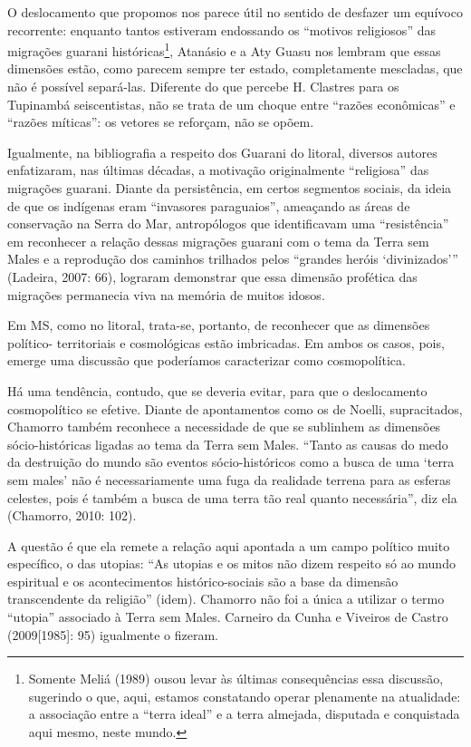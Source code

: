O deslocamento que propomos nos parece útil no sentido de desfazer um
equívoco recorrente: enquanto tantos estiveram endossando os ``motivos
religiosos'' das migrações guarani históricas\footnote{Somente Meliá
  (1989) ousou levar às últimas consequências essa discussão, sugerindo
  o que, aqui, estamos constatando operar plenamente na atualidade: a
  associação entre a ``terra ideal'' e a terra almejada, disputada e
  conquistada aqui mesmo, neste mundo.}, Atanásio e a Aty Guasu nos
lembram que essas dimensões estão, como parecem sempre ter estado,
completamente mescladas, que não é possível separá-las. Diferente do que
percebe H. Clastres para os Tupinambá seiscentistas, não se trata de um
choque entre ``razões econômicas'' e ``razões míticas'': os vetores se
reforçam, não se opõem.

Igualmente, na bibliografia a respeito dos Guarani do litoral, diversos
autores enfatizaram, nas últimas décadas, a motivação originalmente
``religiosa'' das migrações guarani. Diante da persistência, em certos
segmentos sociais, da ideia de que os indígenas eram ``invasores
paraguaios'', ameaçando as áreas de conservação na Serra do Mar,
antropólogos que identificavam uma ``resistência'' em reconhecer a
relação dessas migrações guarani com o tema da Terra sem Males e a
reprodução dos caminhos trilhados pelos ``grandes heróis `divinizados'''
(Ladeira, 2007: 66), lograram demonstrar que essa dimensão profética das
migrações permanecia viva na memória de muitos idosos.

Em MS, como no litoral, trata-se, portanto, de reconhecer que as
dimensões político- territoriais e cosmológicas estão imbricadas. Em
ambos os casos, pois, emerge uma discussão que poderíamos caracterizar
como cosmopolítica.

Há uma tendência, contudo, que se deveria evitar, para que o
deslocamento cosmopolítico se efetive. Diante de apontamentos como os de
Noelli, supracitados, Chamorro também reconhece a necessidade de que se
sublinhem as dimensões sócio-históricas ligadas ao tema da Terra sem
Males. ``Tanto as causas do medo da destruição do mundo são eventos
sócio-históricos como a busca de uma `terra sem males' não é
necessariamente uma fuga da realidade terrena para as esferas celestes,
pois é também a busca de uma terra tão real quanto necessária'', diz ela
(Chamorro, 2010: 102).

A questão é que ela remete a relação aqui apontada a um campo político
muito específico, o das utopias: ``As utopias e os mitos não dizem
respeito só ao mundo espiritual e os acontecimentos histórico-sociais
são a base da dimensão transcendente da religião'' (idem). Chamorro não
foi a única a utilizar o termo ``utopia'' associado à Terra sem Males.
Carneiro da Cunha e Viveiros de Castro (2009{[}1985{]}: 95) igualmente o
fizeram.

